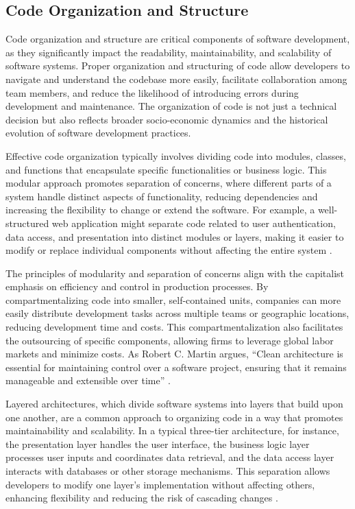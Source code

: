 \begin{refsection}
\subsection{Code Organization and Structure}

Code organization and structure are critical components of software development, as they significantly impact the readability, maintainability, and scalability of software systems. Proper organization and structuring of code allow developers to navigate and understand the codebase more easily, facilitate collaboration among team members, and reduce the likelihood of introducing errors during development and maintenance. The organization of code is not just a technical decision but also reflects broader socio-economic dynamics and the historical evolution of software development practices.

Effective code organization typically involves dividing code into modules, classes, and functions that encapsulate specific functionalities or business logic. This modular approach promotes separation of concerns, where different parts of a system handle distinct aspects of functionality, reducing dependencies and increasing the flexibility to change or extend the software. For example, a well-structured web application might separate code related to user authentication, data access, and presentation into distinct modules or layers, making it easier to modify or replace individual components without affecting the entire system \cite[pp.~95-98]{Martin2008}.

The principles of modularity and separation of concerns align with the capitalist emphasis on efficiency and control in production processes. By compartmentalizing code into smaller, self-contained units, companies can more easily distribute development tasks across multiple teams or geographic locations, reducing development time and costs. This compartmentalization also facilitates the outsourcing of specific components, allowing firms to leverage global labor markets and minimize costs. As Robert C. Martin argues, “Clean architecture is essential for maintaining control over a software project, ensuring that it remains manageable and extensible over time” \cite[pp.~102-105]{Martin2008}.

Layered architectures, which divide software systems into layers that build upon one another, are a common approach to organizing code in a way that promotes maintainability and scalability. In a typical three-tier architecture, for instance, the presentation layer handles the user interface, the business logic layer processes user inputs and coordinates data retrieval, and the data access layer interacts with databases or other storage mechanisms. This separation allows developers to modify one layer’s implementation without affecting others, enhancing flexibility and reducing the risk of cascading changes \cite[pp.~120-122]{Bass2021}.


\end{refsection}
